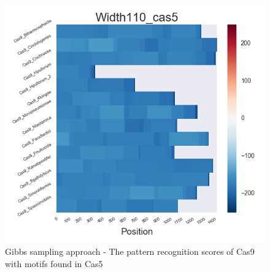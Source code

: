 \documentclass[11pt, oneside]{article}
\begin{document}
\begin{figure}[htbp]
\begin{minipage}{0.32\textwidth}
  \end{minipage}
  \hfill
  \begin{minipage}{0.32\textwidth}
    \centering
    \includegraphics[width=1\textwidth]{images/Width110_cas5_heatmap} %
  \end{minipage}
  \caption{Gibbs sampling approach - The pattern recognition scores of Cas9 with motifs found in Cas5}
  \label{fig:cas5_recog}
\end{figure}
\end{document}
